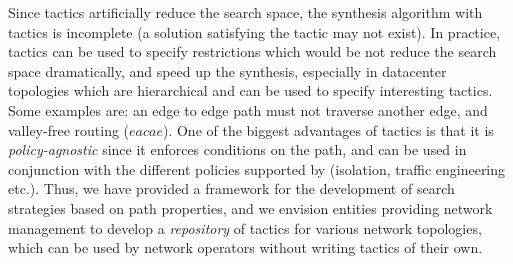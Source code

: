  Since tactics artificially reduce the search space, the synthesis algorithm with tactics is incomplete (a solution satisfying the tactic may not exist). 
 In practice, tactics can be used to specify restrictions which would be not reduce the search space dramatically, 
 and speed up the synthesis, especially in datacenter topologies which are hierarchical 
 and can be used to specify interesting tactics. Some examples are: an edge to edge path must not
 traverse another edge, and valley-free routing ($eacae$). One of the biggest advantages
 of tactics is that it is \emph{policy-agnostic} since it enforces conditions on the path, and
 can be used in conjunction with the different policies supported by \name (isolation, traffic engineering etc.).  
 Thus, we have provided a framework for the
 development of search strategies based on path properties, and we envision entities providing network
 management to develop a \emph{repository} of tactics for various network topologies, 
 which can be used by network operators without writing tactics of their own. 

